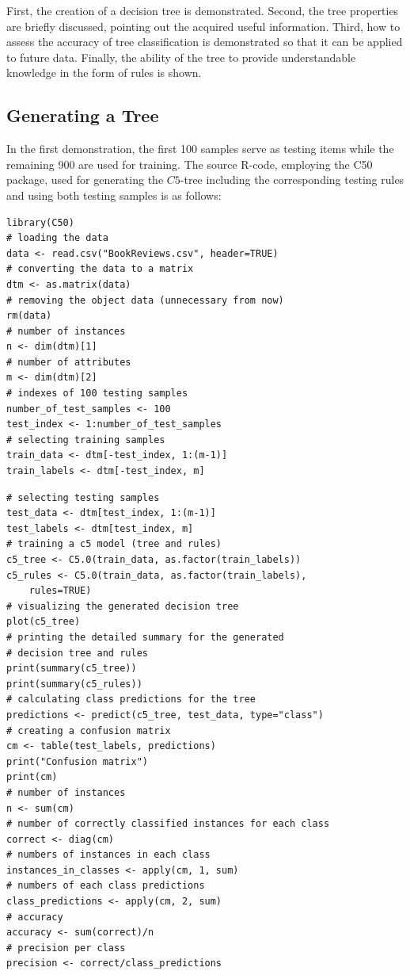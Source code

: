First, the creation of a decision tree is demonstrated. Second, the tree properties are briefly discussed, pointing out the acquired useful information. Third, how to assess the accuracy of tree classification is demonstrated so that it can be applied to future data. Finally, the ability of the tree to provide understandable knowledge in the form of rules is shown.

\subsection{Generating a Tree}
In the first demonstration, the first 100 samples serve as testing items while the remaining 900 are used for training. The source R-code, employing the C50 package, used for generating the $C 5$-tree including the corresponding testing rules and using both testing samples is as follows:

\begin{verbatim}
library(C50)
# loading the data
data <- read.csv("BookReviews.csv", header=TRUE)
# converting the data to a matrix
dtm <- as.matrix(data)
# removing the object data (unnecessary from now)
rm(data)
# number of instances
n <- dim(dtm)[1]
# number of attributes
m <- dim(dtm)[2]
# indexes of 100 testing samples
number_of_test_samples <- 100
test_index <- 1:number_of_test_samples
# selecting training samples
train_data <- dtm[-test_index, 1:(m-1)]
train_labels <- dtm[-test_index, m]
\end{verbatim}

\begin{verbatim}
# selecting testing samples
test_data <- dtm[test_index, 1:(m-1)]
test_labels <- dtm[test_index, m]
# training a c5 model (tree and rules)
c5_tree <- C5.0(train_data, as.factor(train_labels))
c5_rules <- C5.0(train_data, as.factor(train_labels),
    rules=TRUE)
# visualizing the generated decision tree
plot(c5_tree)
# printing the detailed summary for the generated
# decision tree and rules
print(summary(c5_tree))
print(summary(c5_rules))
# calculating class predictions for the tree
predictions <- predict(c5_tree, test_data, type="class")
# creating a confusion matrix
cm <- table(test_labels, predictions)
print("Confusion matrix")
print(cm)
# number of instances
n <- sum(cm)
# number of correctly classified instances for each class
correct <- diag(cm)
# numbers of instances in each class
instances_in_classes <- apply(cm, 1, sum)
# numbers of each class predictions
class_predictions <- apply(cm, 2, sum)
# accuracy
accuracy <- sum(correct)/n
# precision per class
precision <- correct/class_predictions
\end{verbatim}

